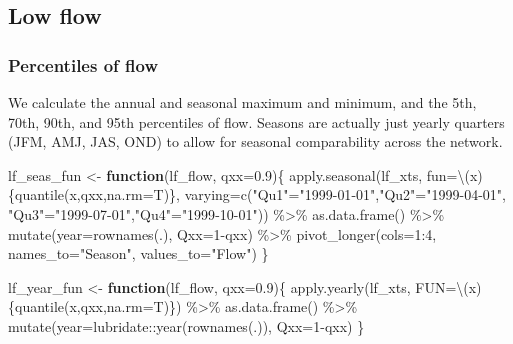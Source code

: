 \documentclass[
]{article}
\newenvironment{Shaded}{\begin{snugshade}}{\end{snugshade}}
\newcommand{\AttributeTok}[1]{\textcolor[rgb]{0.77,0.63,0.00}{#1}}
\newcommand{\ControlFlowTok}[1]{\textcolor[rgb]{0.13,0.29,0.53}{\textbf{#1}}}
\newcommand{\DecValTok}[1]{\textcolor[rgb]{0.00,0.00,0.81}{#1}}
\newcommand{\FloatTok}[1]{\textcolor[rgb]{0.00,0.00,0.81}{#1}}
\newcommand{\FunctionTok}[1]{\textcolor[rgb]{0.00,0.00,0.00}{#1}}
\newcommand{\NormalTok}[1]{#1}
\newcommand{\OtherTok}[1]{\textcolor[rgb]{0.56,0.35,0.01}{#1}}
\newcommand{\SpecialCharTok}[1]{\textcolor[rgb]{0.00,0.00,0.00}{#1}}
\newcommand{\StringTok}[1]{\textcolor[rgb]{0.31,0.60,0.02}{#1}}
\begin{document}
\hypertarget{low-flow}{%
\subsection{Low flow}\label{low-flow}}

\hypertarget{percentiles-of-flow}{%
\subsubsection{Percentiles of flow}\label{percentiles-of-flow}}

We calculate the annual and seasonal maximum and minimum, and the 5th,
70th, 90th, and 95th percentiles of flow. Seasons are actually just
yearly quarters (JFM, AMJ, JAS, OND) to allow for seasonal comparability
across the network.

\begin{Shaded}
\begin{Highlighting}[]
\NormalTok{lf\_seas\_fun }\OtherTok{\textless{}{-}} \ControlFlowTok{function}\NormalTok{(lf\_flow, }\AttributeTok{qxx=}\FloatTok{0.9}\NormalTok{)\{}
  \FunctionTok{apply.seasonal}\NormalTok{(lf\_xts, }\AttributeTok{fun=}\NormalTok{\textbackslash{}(x)\{}\FunctionTok{quantile}\NormalTok{(x,qxx,}\AttributeTok{na.rm=}\NormalTok{T)\},}
                 \AttributeTok{varying=}\FunctionTok{c}\NormalTok{(}\StringTok{"Qu1"}\OtherTok{=}\StringTok{"1999{-}01{-}01"}\NormalTok{,}\StringTok{"Qu2"}\OtherTok{=}\StringTok{"1999{-}04{-}01"}\NormalTok{,}
                           \StringTok{"Qu3"}\OtherTok{=}\StringTok{"1999{-}07{-}01"}\NormalTok{,}\StringTok{"Qu4"}\OtherTok{=}\StringTok{"1999{-}10{-}01"}\NormalTok{)) }\SpecialCharTok{\%\textgreater{}\%}
    \FunctionTok{as.data.frame}\NormalTok{() }\SpecialCharTok{\%\textgreater{}\%}
    \FunctionTok{mutate}\NormalTok{(}\AttributeTok{year=}\FunctionTok{rownames}\NormalTok{(.), }\AttributeTok{Qxx=}\DecValTok{1}\SpecialCharTok{{-}}\NormalTok{qxx) }\SpecialCharTok{\%\textgreater{}\%}
    \FunctionTok{pivot\_longer}\NormalTok{(}\AttributeTok{cols=}\DecValTok{1}\SpecialCharTok{:}\DecValTok{4}\NormalTok{, }\AttributeTok{names\_to=}\StringTok{"Season"}\NormalTok{, }\AttributeTok{values\_to=}\StringTok{"Flow"}\NormalTok{)}
\NormalTok{\}}

\NormalTok{lf\_year\_fun }\OtherTok{\textless{}{-}} \ControlFlowTok{function}\NormalTok{(lf\_flow, }\AttributeTok{qxx=}\FloatTok{0.9}\NormalTok{)\{}
    \FunctionTok{apply.yearly}\NormalTok{(lf\_xts, }\AttributeTok{FUN=}\NormalTok{\textbackslash{}(x)\{}\FunctionTok{quantile}\NormalTok{(x,qxx,}\AttributeTok{na.rm=}\NormalTok{T)\}) }\SpecialCharTok{\%\textgreater{}\%}
    \FunctionTok{as.data.frame}\NormalTok{() }\SpecialCharTok{\%\textgreater{}\%}
    \FunctionTok{mutate}\NormalTok{(}\AttributeTok{year=}\NormalTok{lubridate}\SpecialCharTok{::}\FunctionTok{year}\NormalTok{(}\FunctionTok{rownames}\NormalTok{(.)), }\AttributeTok{Qxx=}\DecValTok{1}\SpecialCharTok{{-}}\NormalTok{qxx)}
\NormalTok{\}}


\end{Highlighting}
\end{Shaded}
\end{document}
